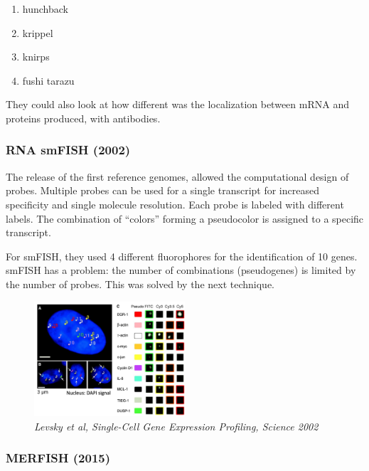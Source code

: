 \begin{enumerate}
\def\labelenumi{\arabic{enumi}.}
\tightlist
\item
  hunchback
\item
  krippel
\item
  knirps
\item
  fushi tarazu
\end{enumerate}

They could also look at how different was the localization between mRNA
and proteins produced, with antibodies.

\hypertarget{rna-smfish-2002}{%
\subsubsection{\texorpdfstring{RNA \textbf{smFISH
(2002)}}{RNA smFISH (2002)}}\label{rna-smfish-2002}}

The release of the first reference genomes, allowed the computational
design of probes. Multiple probes can be used for a single transcript
for increased specificity and single molecule resolution. Each probe is
labeled with different labels. The combination of ``colors'' forming a
pseudocolor is assigned to a specific transcript.

For smFISH, they used 4 different fluorophores for the identification of
10 genes. smFISH has a problem: the number of combinations (pseudogenes)
is limited by the number of probes. This was solved by the next
technique.

\begin{figure}
\centering
\includegraphics[width=0.5\textwidth]{images/Screenshot_5.png}
\caption{\emph{Levsky et al, Single-Cell Gene Expression Profiling,
Science 2002}}
\end{figure}

\hypertarget{merfish-2015}{%
\subsubsection{\texorpdfstring{\textbf{MERFISH
(2015)}}{MERFISH (2015)}}\label{merfish-2015}}

